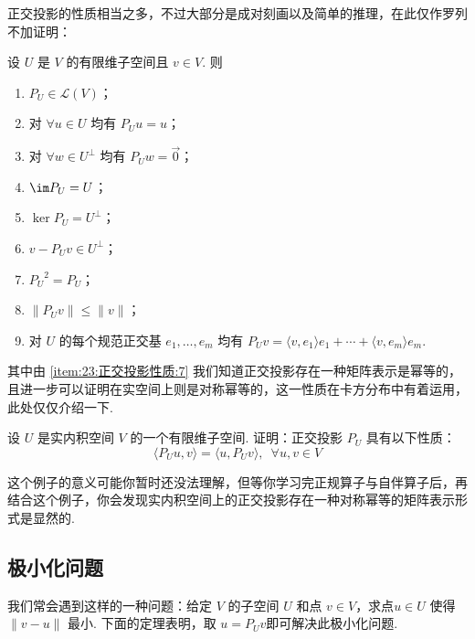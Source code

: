 正交投影的性质相当之多，不过大部分是成对刻画以及简单的推理，在此仅作罗列不加证明：

设 $ U $ 是 $ V $ 的有限维子空间且 $ v \in V$. 则
\begin{enumerate}
    \item $ P_U \in \mathcal{L} (V) $；

    \item 对 $ \forall u \in U$ 均有 $ P_U u = u $；

    \item 对 $ \forall w \in U^{\perp}$ 均有 $ P_U w = \vec{0} $；

    \item $ \im P_U = U$；

    \item $ \ker P_U = U^{\perp}$；

    \item $ v - P_U v \in U^{\perp}$；

    \item \label{item:23:正交投影性质:7}
          $ {P_U}^{2} = P_U$；

    \item $ \lVert P_U v\rVert \leqslant \lVert v \rVert $；

    \item 对 $ U $ 的每个规范正交基 $e_1, \ldots , e_m$ 均有 $ P_U v = \langle v, e_1 \rangle e_1 + \cdots + \langle v, e_m \rangle e_m$.
\end{enumerate}
其中由 \ref*{item:23:正交投影性质:7} 我们知道正交投影存在一种矩阵表示是幂等的，且进一步可以证明在实空间上则是对称幂等的，这一性质在卡方分布中有着运用，此处仅仅介绍一下.

\begin{example}
    设 $ U $ 是实内积空间 $ V $ 的一个有限维子空间. 证明：正交投影 $ P_U $ 具有以下性质：
    \[\langle P_U u, v\rangle = \langle u, P_U v\rangle, \enspace \forall u, v \in V \]
\end{example}

这个例子的意义可能你暂时还没法理解，但等你学习完正规算子与自伴算子后，再结合这个例子，你会发现实内积空间上的正交投影存在一种对称幂等的矩阵表示形式是显然的.

\subsection{极小化问题}

我们常会遇到这样的一种问题：给定 $ V $ 的子空间 $ U $ 和点 $ v \in V $，求点$ u \in U $ 使得 $ \lVert v - u \rVert $ 最小. 下面的定理表明，取 $ u = P_U v$即可解决此极小化问题.

